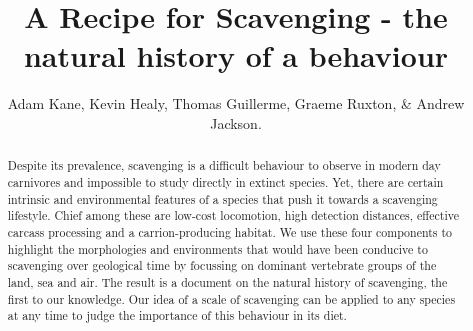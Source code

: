 \documentclass[a4paper,12pt]{article}
\title{A Recipe for Scavenging - the natural history of a behaviour}
\author{Adam Kane, Kevin Healy, Thomas Guillerme, Graeme Ruxton, \& Andrew Jackson.}
\begin{document}


\begin{abstract} 
Despite its prevalence, scavenging is a difficult behaviour to observe in modern day carnivores and impossible to study directly in extinct species. 
Yet, there are certain intrinsic and environmental features of a species that push it towards a scavenging lifestyle. Chief among these are low-cost locomotion, high detection distances, effective carcass processing and a carrion-producing habitat. 
We use these four components to highlight the morphologies and environments that would have been conducive to scavenging over geological time by focussing on dominant vertebrate groups of the land, sea and air. 
The result is a document on the natural history of scavenging, the first to our knowledge. 
Our idea of a scale of scavenging can be applied to any species at any time to judge the importance of this behaviour in its diet. 
\end{abstract}

\newpage
\end{document}
